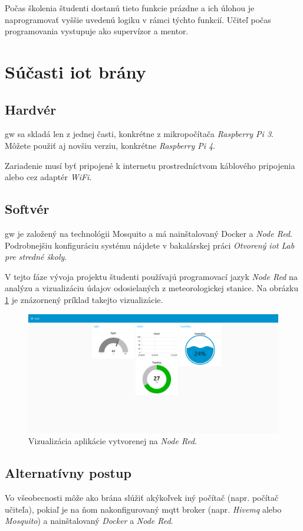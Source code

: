 Počas školenia študenti dostanú tieto funkcie prázdne a ich úlohou je naprogramovať vyššie uvedenú logiku v rámci týchto funkcií. Učiteľ počas programovania vystupuje ako supervízor a mentor.

\section{Súčasti \gls{iot} brány}
\subsection{Hardvér}
\gls{gw} sa skladá len z jednej časti, konkrétne z mikropočítača \textit{Raspberry Pi 3}. Môžete použiť aj novšiu verziu, konkrétne \textit{Raspberry Pi 4}. 

Zariadenie musí byť pripojené k internetu prostredníctvom káblového pripojenia alebo cez adaptér \textit{WiFi}. 

\subsection{Softvér}
\gls{gw} je založený na technológii Mosquito a má nainštalovaný Docker a \textit{Node Red}. Podrobnejšiu konfiguráciu systému nájdete v bakalárskej práci \textit{Otvorený \gls{iot} Lab pre stredné školy}\cite{bookSimon}. 

V tejto fáze vývoja projektu študenti používajú programovací jazyk \textit{Node Red} na analýzu a vizualizáciu údajov odosielaných z meteorologickej stanice. Na obrázku \ref{nodeVisual1} je znázornený príklad takejto vizualizácie.

\begin{figure}[!ht]
    \centering
    \includegraphics[width=\textwidth]{figures/node_obr}
    \caption{Vizualizácia aplikácie vytvorenej na \textit{Node Red}. \label{nodeVisual1}}
\end{figure}

\subsection{Alternatívny postup}
Vo všeobecnosti môže ako brána slúžiť akýkoľvek iný počítač (napr. počítač učiteľa), pokiaľ je na ňom nakonfigurovaný \gls{mqtt} broker (napr. \textit{Hivemq} alebo \textit{Mosquito}) a nainštalovaný \textit{Docker} a \textit{Node Red}.

